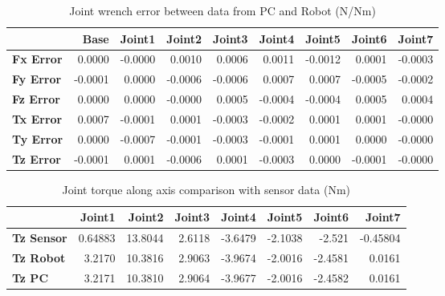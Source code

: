 \begin{table}[h!]
	\centering
	\caption{Joint wrench error between data from PC and Robot (N/Nm)}
	\label{wrech_Error_Pose9}
	\begin{tabular}{|l|r|r|r|r|r|r|r|r|}
		\hline
		\textbf{}  & \textbf{Base} & \textbf{Joint1}  & \textbf{Joint2}  & \textbf{Joint3}  & \textbf{Joint4}  & \textbf{Joint5}  & \textbf{Joint6}  & \textbf{Joint7} \\ \hline
		\textbf{Fx Error}  & 0.0000        & -0.0000        & 0.0010        & 0.0006        & 0.0011        & -0.0012        & 0.0001        & -0.0003 \\ \hline
		\textbf{Fy Error}  & -0.0001        & 0.0000        & -0.0006        & -0.0006        & 0.0007        & 0.0007        & -0.0005        & -0.0002 \\ \hline
		\textbf{Fz Error}  & 0.0000        & 0.0000        & -0.0000        & 0.0005        & -0.0004        & -0.0004        & 0.0005        & 0.0004 \\ \hline
		\textbf{Tx Error}  & 0.0007        & -0.0001        & 0.0001        & -0.0003        & -0.0002        & 0.0001        & 0.0001        & -0.0000 \\ \hline
		\textbf{Ty Error}  & 0.0000        & -0.0007        & -0.0001        & -0.0003        & -0.0001        & 0.0001        & 0.0000        & -0.0000 \\ \hline
		\textbf{Tz Error}  & -0.0001        & 0.0001        & -0.0006        & 0.0001        & -0.0003        & 0.0000        & -0.0001        & -0.0000 \\ \hline
	\end{tabular}
\end{table}

\begin{table}[h!]
	\centering
	\caption{Joint torque along axis comparison with sensor data (Nm)}
	\label{wrech_Sensor_Pose9}
	\begin{tabular}{|l|r|r|r|r|r|r|r|}
		\hline
		\textbf{} & \textbf{Joint1} & \textbf{Joint2} & \textbf{Joint3} & \textbf{Joint4} & \textbf{Joint5} & \textbf{Joint6} & \textbf{Joint7} \\ \hline
		\textbf{Tz Sensor}  & 0.64883           & 13.8044           & 2.6118            & -3.6479           & -2.1038           & -2.521           & -0.45804           \\ \hline
		\textbf{Tz Robot}  	& 3.2170           & 10.3816           & 2.9063            & -3.9674           & -2.0016           & -2.4581           & 0.0161           \\ \hline
		\textbf{Tz PC}  	& 3.2171           & 10.3810           & 2.9064            & -3.9677           & -2.0016           & -2.4582           & 0.0161           \\ \hline
	\end{tabular}
\end{table}

